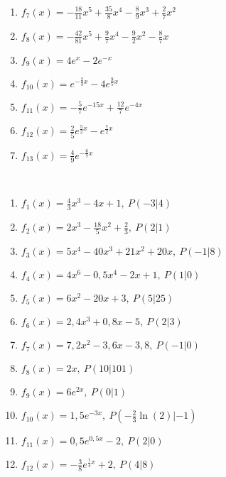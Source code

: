\begin{minipage}{\textwidth}
\begin{minipage}{.4\textwidth}
\begin{Exercise}[title={\raggedright Bestimme jeweils alle Stammfunktionen.}, label=stammfunktionenA2]
\begin{enumerate}[label=\alph*)]
				\item \(f_7(x)=-\frac{18}{11}x^5+\frac{35}{8}x^4-\frac{8}{9}x^3+\frac{2}{7}x^2\)
				\item \(f_8(x)=-\frac{42}{81}x^5+\frac{9}{7}x^4-\frac{9}{2}x^2-\frac{8}{7}x\)
				\item \(f_9(x)=4e^x-2e^{-x}\)
				\item \(f_{10}(x)=e^{-\frac{2}{3}x}-4e^{\frac{9}{5}x}\)
				\item \(f_{11}(x)=-\frac{5}{7}e^{-15x}+\frac{12}{7}e^{-4x}\)
				\item \(f_{12}(x)=\frac{2}{5}e^{\frac{5}{2}x}-e^{\frac{7}{2}x}\)
				\item \(f_{13}(x)=\frac{4}{9}e^{-\frac{6}{7}x}\)
			\end{enumerate}
		\end{Exercise}
	\end{minipage}
\end{minipage}
\begin{Exercise}[title={\raggedright Bestimme jeweils die Stammfunktion, deren Schaubild durch den angegebenen Punkt P verläuft.}, label=stammfunktionenA3]\\
	\begin{minipage}{.5\textwidth}
		\begin{enumerate}[label=\alph*)]
			\item \(f_1(x)=\frac{4}{3}x^3-4x+1,\ P(-3|4)\)
			\item \(f_2(x)=2x^3-\frac{18}{5}x^2+\frac{2}{3},\ P(2|1)\)
			\item \(f_3(x)=5x^4-40x^3+21x^2+20x,\ P(-1|8)\)
			\item \(f_4(x)=4x^6-0,5x^4-2x+1,\ P(1|0)\)
			\item \(f_5(x)=6x^2-20x+3,\ P(5|25)\)
			\item \(f_6(x)=2,4x^3+0,8x-5,\ P(2|3)\)
		\end{enumerate}
	\end{minipage}
	\begin{minipage}{.5\textwidth}
		\begin{enumerate}[label=\alph*)]
			\setcounter{enumi}{6}
			\item \(f_7(x)=7,2x^2-3,6x-3,8,\ P(-1|0)\)
			\item \(f_8(x)=2x,\ P(10|101)\)
			\item \(f_9(x)=6e^{2x},\ P(0|1)\)%
			\item \(f_{10}(x)=1,5e^{-3x},\ P(-\frac{2}{3}\ln(2)|-1)\)
			\item \(f_{11}(x)=0,5e^{0,5x}-2,\ P(2|0)\)
			\item \(f_{12}(x)=-\frac{3}{8}e^{\frac{1}{4}x}+2,\ P(4|8)\)
		\end{enumerate}
	\end{minipage}
\end{Exercise}


